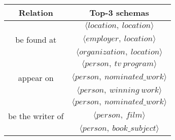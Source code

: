 \begin{table}[ht]
	\centering
	\begin{tabular}{c|c}
        \hline
		Relation & Top-3 schemas \\
        \hline
        & $\langle location,\ location \rangle$ \\
        be found at & $\langle employer,\ location \rangle$ \\
        & $\langle organization,\ location \rangle$\\
        \hline
        & $\langle person,\ tv\ program \rangle$\\
        appear on & $\langle person,\ nominated\_work \rangle$\\
        & $\langle person,\ winning\ work \rangle$\\
        \hline
        & $\langle person,\ nominated\_work \rangle$\\
        be the writer of & $\langle person,\ film \rangle$\\
        & $\langle person,\ book\_subject \rangle$\\
        \hline
	\end{tabular}%
	\label{tab:tinf-sample}%
\end{table}

